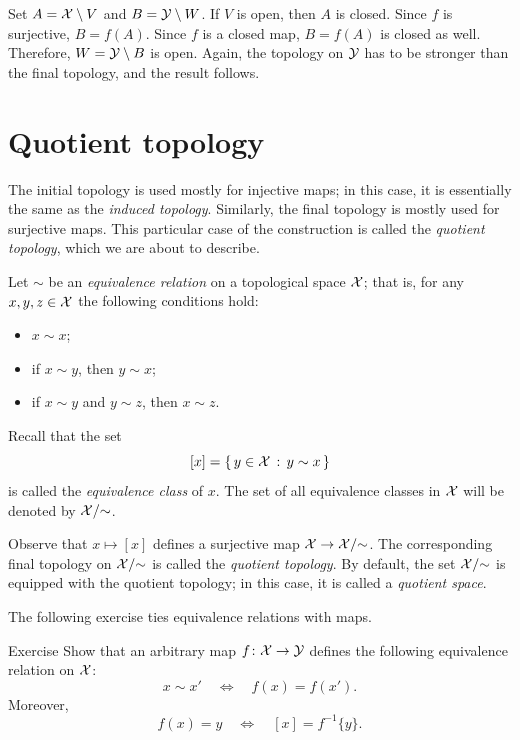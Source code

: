 Set $A=\mathcal{X}\setminus V$ and $B=\mathcal{Y}\setminus W$.
If $V$ is open, then $A$ is closed.
Since $f$ is surjective, $B=f(A)$.
Since $f$ is a closed map, $B=f(A)$ is closed as well.
Therefore, $W=\mathcal{Y}\setminus B$ is open.
Again, the topology on $\mathcal{Y}$ has to be stronger than the final topology, and the result follows.
\qeds

\section{Quotient topology}

The initial topology is used mostly for injective maps; in this case, it is essentially the same as the \emph{induced topology}.
Similarly, the final topology is mostly used for surjective maps.
This particular case of the construction is called the \emph{quotient topology},
which we are about to describe.

Let $\sim$ be an \emph{equivalence relation} on a topological space $\mathcal{X}$;
that is, for any $x,y,z\in\mathcal{X}$ the following conditions hold:
\begin{itemize}
 \item $x\sim x$;
 \item if $x\sim y$, then $y\sim x$;
 \item if $x\sim y$ and $y\sim z$, then $x\sim z$.
\end{itemize}

Recall that the set
\[[x]=\left\{\,{y\in \mathcal{X}}\,:\,{y\sim x}\,\right\}\]
is called the \emph{equivalence class} of $x$.
The set of all equivalence classes in $\mathcal{X}$ will be denoted by $\mathcal{X}/{\sim}$.

Observe that $x\mapsto [x]$ defines a surjective map $\mathcal{X}\to \mathcal{X}/{\sim}$.
The corresponding final topology on $\mathcal{X}/{\sim}$ is called the \emph{quotient topology}.
By default, the set $\mathcal{X}/{\sim}$ is equipped with the quotient topology;
in this case, it is called a \emph{quotient space}.

The following exercise ties equivalence relations with maps.

\begin{thm}{Exercise}\label{ex:eq-relation-f}
Show that an arbitrary map $f\colon\mathcal{X}\to \mathcal{Y}$ defines the following equivalence relation on $\mathcal{X}$:
\[x\sim x'\quad\Leftrightarrow\quad f(x)=f(x').\]
Moreover,
\[f(x)=y\quad\Leftrightarrow\quad [x]=f^{-1}\{y\}.\]
\end{thm}

